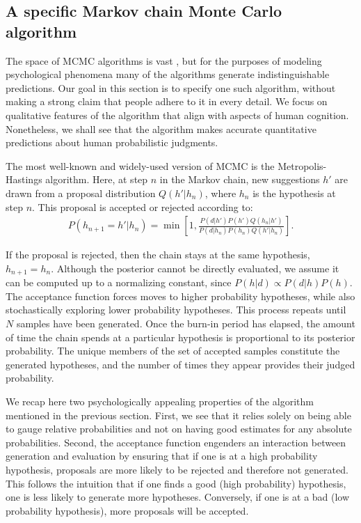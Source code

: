 \subsection{A specific Markov chain Monte Carlo algorithm}

The space of MCMC algorithms is vast \citep{robert13}, but for the purposes of modeling psychological phenomena many of the algorithms generate indistinguishable predictions. Our goal in this section is to specify one such algorithm, without making a strong claim that people adhere to it in every detail. We focus on qualitative features of the algorithm that align with aspects of human cognition. Nonetheless, we shall see that the algorithm makes accurate quantitative predictions about human probabilistic judgments.

The most well-known and widely-used version of MCMC is the Metropolis-Hastings algorithm. Here, at step $n$ in the Markov chain, new suggestions $h'$ are drawn from a proposal distribution $Q(h'|h_n)$, where $h_n$ is the hypothesis at step $n$. This proposal is accepted or rejected according to:
\begin{align}
P(h_{n+1}=h'|h_n) = \min\left[1, \frac{P(d|h')P(h') Q(h_n|h')}{P(d|h_n) P(h_n) Q(h'|h_n)} \right].
\end{align}

If the proposal is rejected, then the chain stays at the same hypothesis, $h_{n+1}=h_n$. Although the posterior cannot be directly evaluated, we assume it can be computed up to a normalizing constant, since $P(h|d) \propto P(d|h) P(h)$. The acceptance function forces moves to higher probability hypotheses, while also stochastically exploring lower probability hypotheses. This process repeats until $N$ samples have been generated. Once the burn-in period has elapsed, the amount of time the chain spends at a particular hypothesis is proportional to its posterior probability. The unique members of the set of accepted samples constitute the generated hypotheses, and the number of times they appear provides their judged probability.

We recap here two psychologically appealing properties of the algorithm mentioned in the previous section. First, we see that it relies solely on being able to gauge relative probabilities and not on having good estimates for any absolute probabilities. Second, the acceptance function engenders an interaction between generation and evaluation by ensuring that if one is at a high probability hypothesis, proposals are more likely to be rejected and therefore not generated. This follows the intuition  that if one finds a good (high probability) hypothesis, one is less likely to generate more hypotheses. Conversely, if one is at a bad (low probability hypothesis), more proposals will be accepted.

